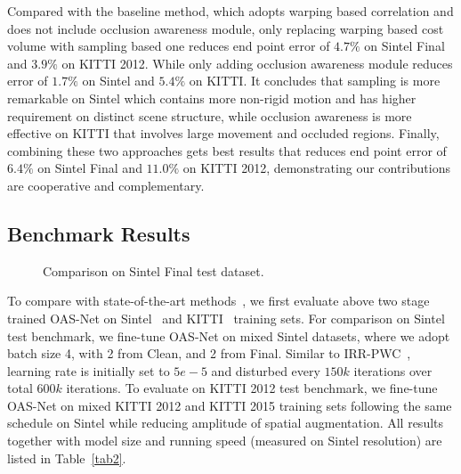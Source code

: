 \documentclass{article}
\begin{document}
Compared with the baseline method, which adopts warping based correlation and does not include occlusion awareness module, only replacing warping based cost volume with sampling based one reduces end point error of $4.7\%$ on Sintel Final and $3.9\%$ on KITTI 2012. While only adding occlusion awareness module reduces error of $1.7\%$ on Sintel and $5.4\%$ on KITTI. It concludes that sampling is more remarkable on Sintel which contains more non-rigid motion and has higher requirement on distinct scene structure, while occlusion awareness is more effective on KITTI that involves large movement and occluded regions. Finally, combining these two approaches gets best results that reduces end point error of $6.4\%$ on Sintel Final and $11.0\%$ on KITTI 2012, demonstrating our contributions are cooperative and complementary.

\subsection{Benchmark Results}
\begin{figure}[!t]
	\captionsetup[subfigure]{farskip=1pt}
	\centering
	\newline
	\newline
	\caption{Comparison on Sintel Final test dataset.}
	\label{fig3}
	\vspace{-1.0 em}
\end{figure}

To compare with state-of-the-art methods~\cite{Ilg2017FlowNet2E,Hui_2018_CVPR,Sun_2018_CVPR,Hur_2019_IRR,Yin_2019_CVPR}, we first evaluate above two stage trained OAS-Net on Sintel~\cite{Butler:ECCV:2012} and KITTI~\cite{Geiger2012CVPR} training sets. For comparison on Sintel test benchmark, we fine-tune OAS-Net on mixed Sintel datasets, where we adopt batch size 4, with 2 from Clean, and 2 from Final. Similar to IRR-PWC~\cite{Hur_2019_IRR}, learning rate is initially set to $5e-5$ and disturbed every $150k$ iterations over total $600k$ iterations. To evaluate on KITTI 2012 test benchmark, we fine-tune OAS-Net on mixed KITTI 2012 and KITTI 2015 training sets following the same schedule on Sintel while reducing amplitude of spatial augmentation. All results together with model size and running speed (measured on Sintel resolution) are listed in Table~\ref{tab2}.
\end{document}
